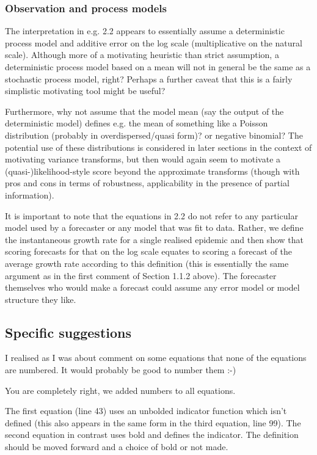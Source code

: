 \documentclass{article}
\newcommand{\black}{\color{black}}
\newcommand{\blue}{\color{blue}}
\begin{document}
\blue
\subsubsection{Observation and process models}
The interpretation in e.g. 2.2 appears to essentially assume a deterministic process model and additive error on the log scale (multiplicative on the natural scale). Although more of a motivating heuristic than strict assumption, a deterministic process model based on a mean will not in general be the same as a stochastic process model, right? Perhaps a further caveat that this is a fairly simplistic motivating tool might be useful?

Furthermore, why not assume that the model mean (say the output of the deterministic model) defines e.g. the mean of something like a Poisson distribution (probably in overdispersed/quasi form)? or negative binomial? The potential use of these distributions is considered in later sections in the context of motivating variance transforms, but then would again seem to motivate a (quasi-)likelihood-style score beyond the approximate transforms (though with pros and cons in terms of robustness, applicability in the presence of partial information).

\black
It is important to note that the equations in 2.2 do not refer to any particular model used by a forecaster or any model that was fit to data. Rather, we define the instantaneous growth rate for a single realised epidemic and then show that scoring forecasts for that on the log scale equates to scoring a forecast of the average growth rate according to this definition (this is essentially the same argument as in the first comment of Section 1.1.2 above). The forecaster themselves who would make a forecast could assume any error model or model structure they like. 

\blue
\subsection{Specific suggestions}

I realised as I was about comment on some equations that none of the equations are numbered. It would probably be good to number them :-)

\black
You are completely right, we added numbers to all equations. 

\blue
The first equation (line 43) uses an unbolded indicator function which isn’t defined (this also appears in the same form in the third equation, line 99). The second equation in contrast uses bold and defines the indicator. The definition should be moved forward and a choice of bold or not made.
\end{document}
